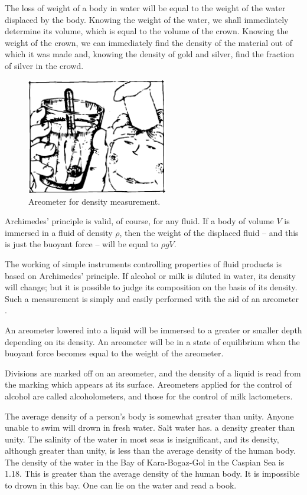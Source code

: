 The loss of weight of a body in water will be equal to the weight of the water displaced by the body. Knowing the weight of the water, we shall immediately determine its volume, which is equal to the volume of the crown. Knowing the weight of the crown, we can immediately find the density of the material out of which it was made and, knowing the density of gold and silver, find the fraction of silver in the crowd.

\begin{figure}[!ht]
\centering
\includegraphics[width=0.55\textwidth]{figures/fig-7-7.pdf}
\caption{Areometer for density measurement.}
\label{fig-7-07}
\end{figure}
Archimedes' principle is valid, of course, for any fluid. If a body of volume $V$ is immersed in a fluid of density $\rho$,
then the weight of the displaced fluid -- and this is just the buoyant force -- will be equal to $\rho gV$.

The working of simple instruments controlling properties of fluid products is based on Archimedes' principle.
If alcohol or milk is diluted in water, its density will change; but it is possible to judge its composition on the
basis of its density. Such a measurement is simply and easily performed with the aid of an areometer .

An areometer lowered into a liquid will be immersed to a greater or smaller depth depending on its density. An areometer will be in a state of equilibrium when the buoyant force becomes equal to the weight of the areometer.

Divisions are marked off on an areometer, and the density of a liquid is read from the marking which appears at its surface. Areometers applied for the control of alcohol are called alcoholometers, and those for the control of milk lactometers.

The average density of a person's body is somewhat greater than unity. Anyone unable to swim will drown in fresh water. Salt water has. a density greater than unity. The salinity of the water in most seas is insignificant, and its density, although greater than unity, is less than the average density of the human body. The density of the water in the Bay of Kara-Bogaz-Gol in the Caspian Sea is 1.18. This is greater than the average density of the human body. It is impossible to drown in this bay. One can lie on the water and read a book.

